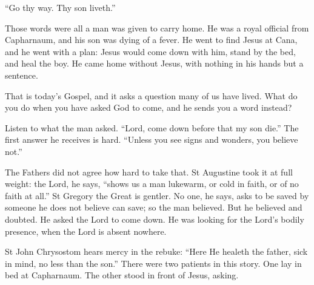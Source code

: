 \raggedcolumns

``Go thy way. Thy son liveth.''

Those words were all a man was given to carry home. He was a royal official
from Capharnaum, and his son was dying of a fever. He went to find Jesus at
Cana, and he went with a plan: Jesus would come down with him, stand by the
bed, and heal the boy. He came home without Jesus, with nothing in his hands
but a sentence.

That is today's Gospel, and it asks a question many of us have lived. What do
you do when you have asked God to come, and he sends you a word instead?

\medskip

Listen to what the man asked. ``Lord, come down before that my son die.'' The
first answer he receives is hard. ``Unless you see signs and wonders, you
believe not.''

The Fathers did not agree how hard to take that. St Augustine took it at full
weight: the Lord, he says, ``shows us a man lukewarm, or cold in faith, or of
no faith at all.'' St Gregory the Great is gentler. No one, he says, asks to be
saved by someone he does not believe can save; so the man believed. But he
believed and doubted. He asked the Lord to come down. He was looking for the
Lord's bodily presence, when the Lord is absent nowhere.

St John Chrysostom hears mercy in the rebuke: ``Here He healeth the father,
sick in mind, no less than the son.'' There were two patients in this story.
One lay in bed at Capharnaum. The other stood in front of Jesus, asking.

